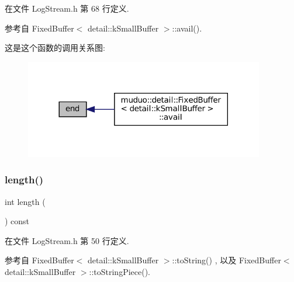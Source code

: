 在文件 Log\+Stream.\+h 第 68 行定义.



参考自 Fixed\+Buffer$<$ detail\+::k\+Small\+Buffer $>$\+::avail().

这是这个函数的调用关系图\+:
\nopagebreak
\begin{figure}[H]
\begin{center}
\leavevmode
\includegraphics[width=296pt]{classmuduo_1_1detail_1_1FixedBuffer_a8f7e2912f169cf1aa7eeaec74b5fd151_icgraph}
\end{center}
\end{figure}
\mbox{\label{classmuduo_1_1detail_1_1FixedBuffer_a91213974fa3ac3959b1c355a9e588f8d}} 
\subsubsection{\texorpdfstring{length()}{length()}}
{\footnotesize\ttfamily int length (\begin{DoxyParamCaption}{ }\end{DoxyParamCaption}) const\hspace{0.3cm}{\ttfamily [inline]}}



在文件 Log\+Stream.\+h 第 50 行定义.



参考自 Fixed\+Buffer$<$ detail\+::k\+Small\+Buffer $>$\+::to\+String() , 以及 Fixed\+Buffer$<$ detail\+::k\+Small\+Buffer $>$\+::to\+String\+Piece().

